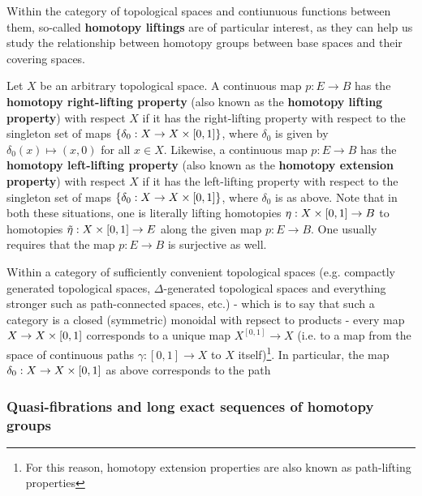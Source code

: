            \begin{example} \label{example: liftings_of_topological_spaces}
                Within the category of topological spaces and contiunuous functions between them, so-called \textbf{homotopy liftings} are of particular interest, as they can help us study the relationship between homotopy groups between base spaces and their covering spaces.
                
                Let $X$ be an arbitrary topological space. A continuous map $p: E \to B$ has the \textbf{homotopy right-lifting property} (also known as the \textbf{homotopy lifting property}) with respect $X$ if it has the right-lifting property with respect to the singleton set of maps $\{\delta_0: X \to X \x [0, 1]\}$, where $\delta_0$ is given by $\delta_0(x) \mapsto (x, 0)$ for all $x \in X$. Likewise, a continuous map $p: E \to B$ has the \textbf{homotopy left-lifting property} (also known as the \textbf{homotopy extension property}) with respect $X$ if it has the left-lifting property with respect to the singleton set of maps $\{\delta_0: X \to X \x [0, 1]\}$, where $\delta_0$ is as above. Note that in both these situations, one is literally lifting homotopies $\eta: X \x [0, 1] \to B$ to homotopies $\tilde{\eta}: X \x [0, 1] \to E$ along the given map $p: E \to B$. One usually requires that the map $p: E \to B$ is surjective as well.
                
                Within a category of sufficiently convenient topological spaces (e.g. compactly generated topological spaces, $\Delta$-generated topological spaces and everything stronger such as path-connected spaces, etc.) - which is to say that such a category is a closed (symmetric) monoidal with repsect to products - every map $X \to X \x [0, 1]$ corresponds to a unique map $X^{[0, 1]} \to X$ (i.e. to a map from the space of continuous paths $\gamma: [0, 1] \to X$ to $X$ itself)\footnote{For this reason, homotopy extension properties are also known as path-lifting properties}. In particular, the map $\delta_0: X \to X \x [0, 1]$ as above corresponds to the path  
            \end{example}
    
        \subsubsection{Quasi-fibrations and long exact sequences of homotopy groups}
            \begin{definition} \label{def: homotopy_groups}
                
            \end{definition}
            
